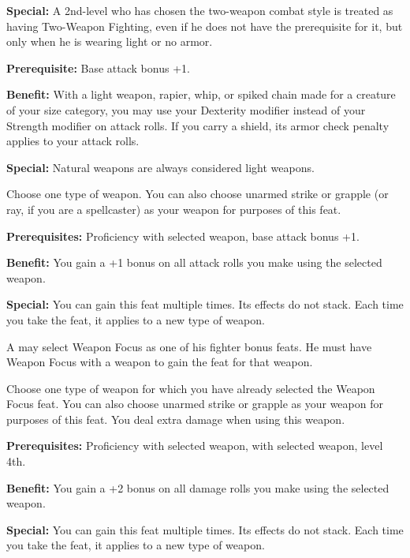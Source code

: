 \textbf{Special:} A 2nd-level  who has chosen the two-weapon combat style 
is treated as having Two-Weapon Fighting, even if he does not have the prerequisite 
for it, but only when he is wearing light or no armor.


\textbf{Prerequisite:} Base attack bonus +1.

\textbf{Benefit:} With a light weapon, rapier, whip, or spiked chain made for a 
creature of your size category, you may use your Dexterity modifier instead of 
your Strength modifier on attack rolls. If you carry a shield, its armor check 
penalty applies to your attack rolls.

\textbf{Special:} Natural weapons are always considered light weapons.


Choose one type of weapon. You can also choose unarmed strike or grapple (or ray, 
if you are a spellcaster) as your weapon for purposes of this feat.

\textbf{Prerequisites:} Proficiency with selected weapon, base attack bonus +1.

\textbf{Benefit:} You gain a +1 bonus on all attack rolls you make using the selected 
weapon.

\textbf{Special:} You can gain this feat multiple times. Its effects do not stack. 
Each time you take the feat, it applies to a new type of weapon.

A  may select Weapon Focus as one of his fighter bonus feats. He must have 
Weapon Focus with a weapon to gain the  feat for that weapon.


Choose one type of weapon for which you have already selected the Weapon Focus 
feat. You can also choose unarmed strike or grapple as your weapon for purposes 
of this feat. You deal extra damage when using this weapon.

\textbf{Prerequisites:} Proficiency with selected weapon,  with selected 
weapon,  level 4th.

\textbf{Benefit:} You gain a +2 bonus on all damage rolls you make using the selected 
weapon.

\textbf{Special:} You can gain this feat multiple times. Its effects do not stack. 
Each time you take the feat, it applies to a new type of weapon.

